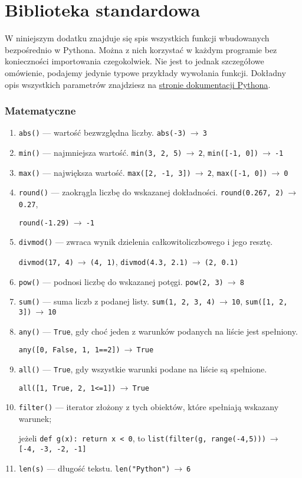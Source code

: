\section{Biblioteka standardowa}
\label{dodatek-C}

W niniejszym dodatku znajduje się spis wszystkich funkcji wbudowanych bezpośrednio w Pythona. Można z nich korzystać w każdym programie bez konieczności importowania czegokolwiek. Nie jest to jednak szczegółowe omówienie, podajemy jedynie typowe przykłady wywołania funkcji. Dokładny opis wszystkich parametrów znajdziesz na \href{https://docs.python.org/3/library/functions.html?highlight=builtin%20functions}{stronie dokumentacji Pythona}.

\subsubsection*{Matematyczne}

\begin{enumerate}[]
    \item \verb|abs()| --- wartość bezwzględna liczby. \verb|abs(-3)|$\ \to\ $\verb|3|
    \item \verb|min()| --- najmniejsza wartość. \verb|min(3, 2, 5)|$\ \to\ $\verb|2|,
    \verb|min([-1, 0])|$\ \to\ $\verb|-1|
    \item \verb|max()| --- największa wartość. \verb|max([2, -1, 3])|$\ \to\ $\verb|2|,
    \verb|max([-1, 0])|$\ \to\ $\verb|0|
    \item \verb|round()| --- zaokrągla liczbę do wskazanej dokładności. \verb|round(0.267, 2)|$\ \to\ $\verb|0.27|,

    \verb|round(-1.29)|$\ \to\ $\verb|-1|
    \item \verb|divmod()| --- zwraca wynik dzielenia całkowitoliczbowego i jego resztę.

    \verb|divmod(17, 4)|$\ \to\ $\verb|(4, 1)|, \verb|divmod(4.3, 2.1)|$\ \to\ $\verb|(2, 0.1)|
    \item \verb|pow()| --- podnosi liczbę do wskazanej potęgi. \verb|pow(2, 3)|$\ \to\ $\verb|8|
    \item \verb|sum()| --- suma liczb z podanej listy. \verb|sum(1, 2, 3, 4)|$\ \to\ $\verb|10|, \verb|sum([1, 2, 3])|$\ \to\ $\verb|10|

    \item \verb|any()| --- \verb|True|, gdy choć jeden z warunków podanych na liście jest spełniony.

    \verb|any([0, False, 1, 1==2])|$\ \to\ $\verb|True|
    \item \verb|all()| --- \verb|True|, gdy wszystkie warunki podane na liście są spełnione.

    \verb|all([1, True, 2, 1<=1])|$\ \to\ $\verb|True|

    \item \verb|filter()| --- iterator złożony z tych obiektów, które spełniają wskazany warunek;

    jeżeli \verb|def g(x): return x < 0|, to \verb|list(filter(g, range(-4,5)))|$\ \to\ $ \verb|[-4, -3, -2, -1]|
    \item \verb|len(s)| --- długość tekstu. \verb|len("Python")|$\ \to\ $\verb|6|
\end{enumerate}


